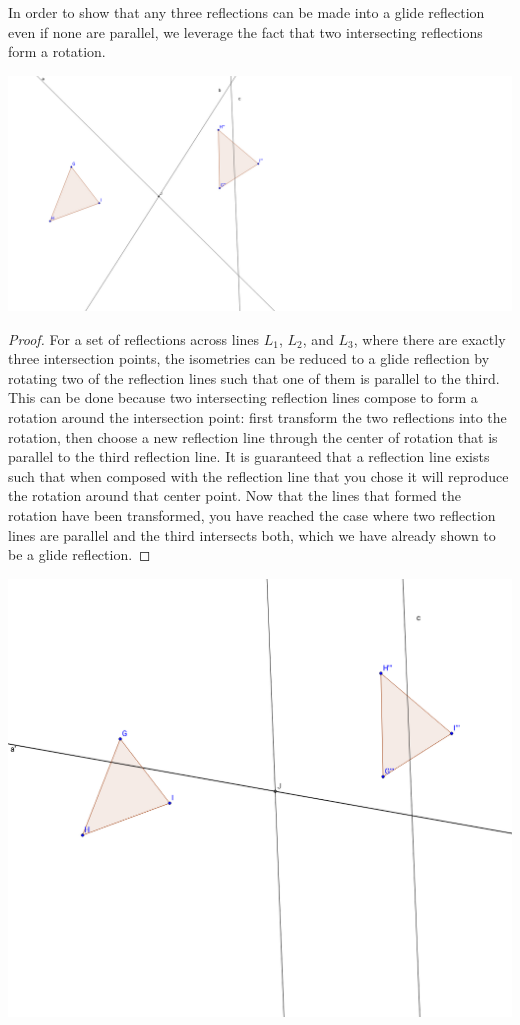 \documentclass[11pt]{article}
\theoremstyle{definition}
\begin{document}
In order to show that any three reflections can be made into a glide
reflection even if none are parallel, we leverage the fact that two
intersecting reflections form a rotation.

\includegraphics[scale=.4]{intersect3}
\begin{proof}
  For a set of reflections across lines $L_{1}$, $L_{2}$, and $L_{3}$, where
  there are exactly three intersection points, the isometries can be reduced to
  a glide reflection by rotating two of the reflection lines such that one of
  them is parallel to the third. This can be done because two intersecting
  reflection lines compose to form a rotation around the intersection point:
  first transform the two reflections into the rotation, then choose a new
  reflection line through the center of rotation that is parallel to the third
  reflection line. It is guaranteed that a reflection line exists such that
  when composed with the reflection line that you chose it will reproduce the
  rotation around that center point. Now that the lines that formed the
  rotation have been transformed, you have reached the case where two
  reflection lines are parallel and the third intersects both, which we have
  already shown to be a glide reflection.

\end{proof}
\includegraphics[scale=.4]{intersect21}
\end{document}
